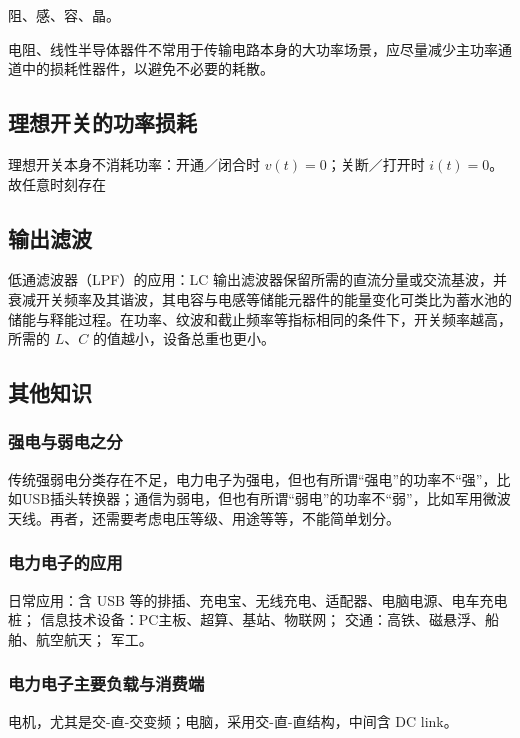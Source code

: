 阻、感、容、晶。


电阻、线性半导体器件不常用于传输电路本身的大功率场景，应尽量减少主功率通道中的损耗性器件，以避免不必要的耗散。

\subsection{理想开关的功率损耗}

理想开关本身不消耗功率：开通／闭合时 $v(t)=0$；关断／打开时 $i(t)=0$。故任意时刻存在

\subsection{输出滤波}

低通滤波器（LPF）的应用：LC 输出滤波器保留所需的直流分量或交流基波，并衰减开关频率及其谐波，其电容与电感等储能元器件的能量变化可类比为蓄水池的储能与释能过程。在功率、纹波和截止频率等指标相同的条件下，开关频率越高，所需的 $L$、$C$ 的值越小，设备总重也更小。

\subsection{其他知识}

\subsubsection{强电与弱电之分}

传统强弱电分类存在不足，电力电子为强电，但也有所谓“强电”的功率不“强”，比如USB插头转换器；通信为弱电，但也有所谓“弱电”的功率不“弱”，比如军用微波天线。再者，还需要考虑电压等级、用途等等，不能简单划分。

\subsubsection{电力电子的应用}

日常应用：含 USB 等的排插、充电宝、无线充电、适配器、电脑电源、电车充电桩；
信息技术设备：PC主板、超算、基站、物联网；
交通：高铁、磁悬浮、船舶、航空航天；
军工。

\subsubsection{电力电子主要负载与消费端}

电机，尤其是交-直-交变频；电脑，采用交-直-直结构，中间含 DC link。

